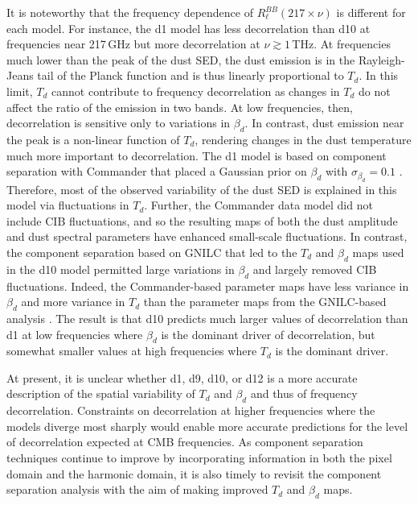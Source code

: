 \documentclass[twocolumn]{aastex631}
\begin{document}
It is noteworthy that the frequency dependence of $R_\ell^{BB}(217\times\nu)$ is different for each model. For instance, the d1 model has less decorrelation than d10 at frequencies near 217\,GHz but more decorrelation at $\nu \gtrsim 1$\,THz. At frequencies much lower than the peak of the dust SED, the dust emission is in the Rayleigh-Jeans tail of the Planck function and is thus linearly proportional to $T_d$. In this limit, $T_d$ cannot contribute to frequency decorrelation as changes in $T_d$ do not affect the ratio of the emission in two bands. At low frequencies, then, decorrelation is sensitive only to variations in $\beta_d$. In contrast, dust emission near the peak is a non-linear function of $T_d$, rendering changes in the dust temperature much more important to decorrelation. The d1 model is based on component separation with Commander that placed a Gaussian prior on $\beta_d$ with $\sigma_{\beta_d} = 0.1$ \citep{planck2014-a12}. Therefore, most of the observed variability of the dust SED is explained in this model via fluctuations in $T_d$. Further, the Commander data model did not include CIB fluctuations, and so the resulting maps of both the dust amplitude and dust spectral parameters have enhanced small-scale fluctuations. In contrast, the component separation based on GNILC that led to the $T_d$ and $\beta_d$ maps used in the d10 model \citep{planck2016-XLVIII} permitted large variations in $\beta_d$ and largely removed CIB fluctuations. Indeed, the Commander-based parameter maps have less variance in $\beta_d$ and more variance in $T_d$ than the parameter maps from the GNILC-based analysis \citep[see][Table~1]{planck2016-XLVIII}. The result is that d10 predicts much larger values of decorrelation than d1 at low frequencies where $\beta_d$ is the dominant driver of decorrelation, but somewhat smaller values at high frequencies where $T_d$ is the dominant driver.

At present, it is unclear whether d1, d9, d10, or d12 is a more accurate description of the spatial variability of $T_d$ and $\beta_d$ and thus of frequency decorrelation. Constraints on decorrelation at higher frequencies where the models diverge most sharply would enable more accurate predictions for the level of decorrelation expected at CMB frequencies. As component separation techniques continue to improve by incorporating information in both the pixel domain and the harmonic domain, it is also timely to revisit the component separation analysis with the aim of making improved $T_d$ and $\beta_d$ maps.
\end{document}
